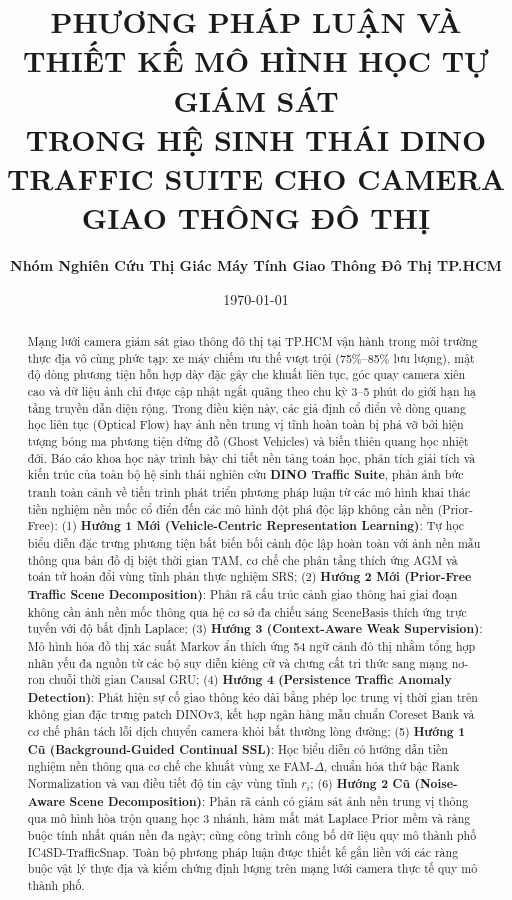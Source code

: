 \documentclass[11pt,a4paper]{article}
\title{\textbf{\Large PHƯƠNG PHÁP LUẬN VÀ THIẾT KẾ MÔ HÌNH HỌC TỰ GIÁM SÁT\\TRONG HỆ SINH THÁI DINO TRAFFIC SUITE CHO CAMERA GIAO THÔNG ĐÔ THỊ}}
\author{\textbf{Nhóm Nghiên Cứu Thị Giác Máy Tính Giao Thông Đô Thị TP.HCM}}
\date{\today}
\begin{document}
\maketitle

\begin{abstract}
Mạng lưới camera giám sát giao thông đô thị tại TP.HCM vận hành trong môi trường thực địa vô cùng phức tạp: xe máy chiếm ưu thế vượt trội (75\%--85\% lưu lượng), mật độ dòng phương tiện hỗn hợp dày đặc gây che khuất liên tục, góc quay camera xiên cao và dữ liệu ảnh chỉ được cập nhật ngắt quãng theo chu kỳ 3--5 phút do giới hạn hạ tầng truyền dẫn diện rộng. Trong điều kiện này, các giả định cổ điển về dòng quang học liên tục (Optical Flow) hay ảnh nền trung vị tĩnh hoàn toàn bị phá vỡ bởi hiện tượng bóng ma phương tiện dừng đỗ (Ghost Vehicles) và biến thiên quang học nhiệt đới. Báo cáo khoa học này trình bày chi tiết nền tảng toán học, phân tích giải tích và kiến trúc của toàn bộ hệ sinh thái nghiên cứu \textbf{DINO Traffic Suite}, phản ánh bức tranh toàn cảnh về tiến trình phát triển phương pháp luận từ các mô hình khai thác tiền nghiệm nền mốc cổ điển đến các mô hình đột phá độc lập không cần nền (Prior-Free):
(1) \textbf{Hướng 1 Mới (Vehicle-Centric Representation Learning)}: Tự học biểu diễn đặc trưng phương tiện bất biến bối cảnh độc lập hoàn toàn với ảnh nền mẫu thông qua bản đồ dị biệt thời gian TAM, cơ chế che phân tầng thích ứng AGM và toán tử hoán đổi vùng tĩnh phản thực nghiệm SRS;
(2) \textbf{Hướng 2 Mới (Prior-Free Traffic Scene Decomposition)}: Phân rã cấu trúc cảnh giao thông hai giai đoạn không cần ảnh nền mốc thông qua hệ cơ sở đa chiếu sáng SceneBasis thích ứng trực tuyến với độ bất định Laplace;
(3) \textbf{Hướng 3 (Context-Aware Weak Supervision)}: Mô hình hóa đồ thị xác suất Markov ẩn thích ứng 54 ngữ cảnh đô thị nhằm tổng hợp nhãn yếu đa nguồn từ các bộ suy diễn kiêng cữ và chưng cất tri thức sang mạng nơ-ron chuỗi thời gian Causal GRU;
(4) \textbf{Hướng 4 (Persistence Traffic Anomaly Detection)}: Phát hiện sự cố giao thông kéo dài bằng phép lọc trung vị thời gian trên không gian đặc trưng patch DINOv3, kết hợp ngân hàng mẫu chuẩn Coreset Bank và cơ chế phân tách lỗi dịch chuyển camera khỏi bất thường lòng đường;
(5) \textbf{Hướng 1 Cũ (Background-Guided Continual SSL)}: Học biểu diễn có hướng dẫn tiền nghiệm nền thông qua cơ chế che khuất vùng xe FAM-$\Delta$, chuẩn hóa thứ bậc Rank Normalization và van điều tiết độ tin cậy vùng tĩnh $r_i$;
(6) \textbf{Hướng 2 Cũ (Noise-Aware Scene Decomposition)}: Phân rã cảnh có giám sát ảnh nền trung vị thông qua mô hình hòa trộn quang học 3 nhánh, hàm mất mát Laplace Prior mềm và ràng buộc tính nhất quán nền đa ngày;
cùng công trình công bố dữ liệu quy mô thành phố IC4SD-TrafficSnap. Toàn bộ phương pháp luận được thiết kế gắn liền với các ràng buộc vật lý thực địa và kiểm chứng định lượng trên mạng lưới camera thực tế quy mô thành phố.
\end{abstract}
\end{document}
